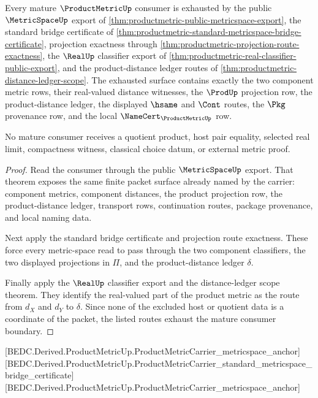 \begin{theorem}
\label{thm:productmetric-mature-consumer-exhaustion}
Every mature $\ProductMetricUp$ consumer is exhausted by the public $\MetricSpaceUp$ export of \autoref{thm:productmetric-public-metricspace-export}, the standard bridge certificate of \autoref{thm:productmetric-standard-metricspace-bridge-certificate}, projection exactness through \autoref{thm:productmetric-projection-route-exactness}, the $\RealUp$ classifier export of \autoref{thm:productmetric-real-classifier-public-export}, and the product-distance ledger routes of \autoref{thm:productmetric-distance-ledger-scope}. The exhausted surface contains exactly the two component metric rows, their real-valued distance witnesses, the $\ProdUp$ projection row, the product-distance ledger, the displayed $\hsame$ and $\Cont$ routes, the $\Pkg$ provenance row, and the local $\NameCert_{\ProductMetricUp}$ row.

No mature consumer receives a quotient product, host pair equality, selected real limit, compactness witness, classical choice datum, or external metric proof.
\end{theorem}
\begin{proof}
Read the consumer through the public $\MetricSpaceUp$ export. That theorem exposes the same finite packet surface already named by the carrier: component metrics, component distances, the product projection row, the product-distance ledger, transport rows, continuation routes, package provenance, and local naming data.

Next apply the standard bridge certificate and projection route exactness. These force every metric-space read to pass through the two component classifiers, the two displayed projections in $\Pi$, and the product-distance ledger $\delta$.

Finally apply the $\RealUp$ classifier export and the distance-ledger scope theorem. They identify the real-valued part of the product metric as the route from $d_X$ and $d_Y$ to $\delta$. Since none of the excluded host or quotient data is a coordinate of the packet, the listed routes exhaust the mature consumer boundary.
\end{proof}

[BEDC.Derived.ProductMetricUp.ProductMetricCarrier\_metricspace\_anchor]
[BEDC.Derived.ProductMetricUp.ProductMetricCarrier\_standard\_metricspace\_bridge\_certificate]
[BEDC.Derived.ProductMetricUp.ProductMetricCarrier\_metricspace\_anchor]


